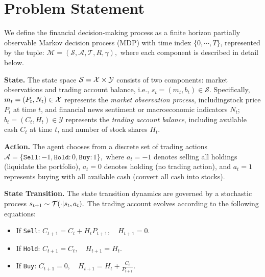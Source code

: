 \section{Problem Statement}\label{Sec:Problem Formulation}

We define the financial decision-making process as a finite horizon partially observable Markov decision process (MDP) with time index $\{0,\cdots,T\}$, represented by the tuple:
$\mathcal{M} = (\mathcal{S}, \mathcal{A}, \mathcal{T}, R, \gamma),$
where each component is described in detail below.

\textbf{State.} The state space $\mathcal{S}=\mathcal{X}\times\mathcal{Y}$ consists of two components: market observations and trading account balance, i.e.,
$s_t = (m_t, b_t) \in \mathcal{S}.$ Specifically,
     $ m_t = (P_t, N_t) \in \mathcal{X}$ represents the \textit{market observation process}, includingstock price $P_t$ at time $t$, and financial news sentiment or macroeconomic indicators $N_t$;
   $ b_t = (C_t, H_t) \in \mathcal{Y}$ represents the \textit{trading account balance}, including available cash $C_t$ at time $t$, and number of stock shares $H_t$.

\textbf{Action.} The agent chooses from a discrete set of trading actions
$\mathcal{A} = \{\texttt{Sell}: -1, \texttt{Hold}: 0, \texttt{Buy}: 1\},$
where $a_t=-1$ denotes selling all holdings (liquidate the portfolio),
$a_t=0$ denotes holding (no trading action), and
$a_t=1$ represents buying with all available cash (convert all cash into stocks).


 \textbf{State Transition.} The state transition dynamics are governed by a stochastic process
$s_{t+1} \sim \mathcal{T}(\cdot | s_t, a_t).$
The trading account evolves according to the following equations:
    \begin{itemize}
        \item If \texttt{Sell}:
        $        C_{t+1} = C_t + H_t P_{t+1}, \quad H_{t+1} = 0.
        $
        \item If \texttt{Hold}:
        $ C_{t+1} = C_t, \quad H_{t+1} = H_t.$
        \item If \texttt{Buy}:
       $        C_{t+1} = 0, \quad H_{t+1} = H_t + \frac{C_t}{P_{t+1}}.$ 
    \end{itemize}


